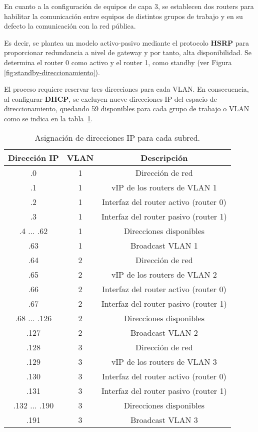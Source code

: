 En cuanto a la configuración de equipos de capa 3, se establecen dos routers para habilitar la comunicación entre equipos de distintos grupos de trabajo y en su defecto la comunicación con la red pública. 

\vspace{1mm}

Es decir, se plantea un modelo activo-pasivo mediante el protocolo \textbf{HSRP} para proporcionar redundancia a nivel de gateway y por tanto, alta disponibilidad. Se determina el router 0 como activo y el router 1, como standby (ver Figura \ref{fig:standby-direccionamiento}).

\vspace{1mm}

El proceso requiere reservar tres direcciones para cada VLAN. En consecuencia, al configurar \textbf{DHCP}, se excluyen nueve direcciones IP del espacio de direccionamiento, quedando 59 disponibles para cada grupo de trabajo o VLAN como se indica en la tabla~\ref{tab:IP}.

\vspace{3mm}

\begin{table}[h]
\centering
\begin{tabular}{|c|c|c|}
\hline
Dirección IP & VLAN & Descripción \\ \hline
.0  & 1 & Dirección de red \\ \hline
.1  & 1 & vIP de los routers de VLAN 1  \\ \hline
.2  & 1 & Interfaz del router activo (router 0)  \\ \hline
.3  & 1 & Interfaz del router pasivo (router 1) \\ \hline
.4 ... .62 & 1 & Direcciones disponibles  \\ \hline
.63  & 1 & Broadcast VLAN 1 \\ \hline
.64  & 2 & Dirección de red \\ \hline
.65  & 2 & vIP de los routers de VLAN 2 \\ \hline
.66  & 2 & Interfaz del router activo (router 0)  \\ \hline
.67  & 2 & Interfaz del router pasivo (router 1)  \\ \hline
.68 ... .126 & 2 & Direcciones disponibles  \\ \hline
.127  & 2 & Broadcast VLAN 2 \\ \hline
.128  & 3 & Dirección de red \\ \hline
.129  & 3 & vIP de los routers de VLAN 3  \\ \hline
.130  & 3 & Interfaz del router activo (router 0) \\ \hline
.131  & 3 & Interfaz del router pasivo (router 1) \\ \hline
.132 ... .190 & 3 & Direcciones disponibles  \\ \hline
.191  & 3 & Broadcast VLAN 3 \\ \hline

\end{tabular}
\caption{Asignación de direcciones IP para cada subred.}
\label{tab:IP}
\end{table}

